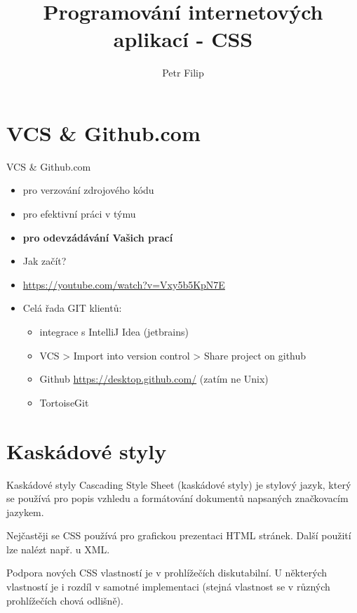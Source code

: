\documentclass{beamer}
\author{Petr Filip}
\title{Programování internetových aplikací - CSS}
\institute{Univerzita Pardubice}
\begin{document}
\maketitle


\section{VCS \& Github.com} 

\begin{frame}{VCS \& Github.com}
\begin{itemize}
	\item pro verzování zdrojového kódu
	\item pro efektivní práci v týmu
	\item \textbf{pro odevzádávání Vašich prací}
\end{itemize}

\begin{itemize}
	\item Jak začít?
	\item \url{https://youtube.com/watch?v=Vxy5b5KpN7E}
\end{itemize}

\begin{itemize}
	\item Celá řada GIT klientů:
	\begin{itemize}
		\item integrace s IntelliJ Idea (jetbrains)
		\item VCS > Import into version control > Share project on github
		\item Github \url{https://desktop.github.com/} (zatím ne Unix)		
		\item TortoiseGit		
	\end{itemize}
\end{itemize}
\end{frame}
  
\section{Kaskádové styly}
  
\begin{frame}{Kaskádové styly}
	Cascading Style Sheet (kaskádové styly) je stylový
jazyk, který se používá pro popis vzhledu a
formátování dokumentů napsaných značkovacím
jazykem.

Nejčastěji se CSS používá pro grafickou prezentaci
HTML stránek. Další použití lze nalézt např. u XML.

Podpora nových CSS vlastností je v prohlížečích
diskutabilní. U některých vlastností je i rozdíl v
samotné implementaci (stejná vlastnost se v
různých prohlížečích chová odlišně).
\end{frame}  
\end{document}
